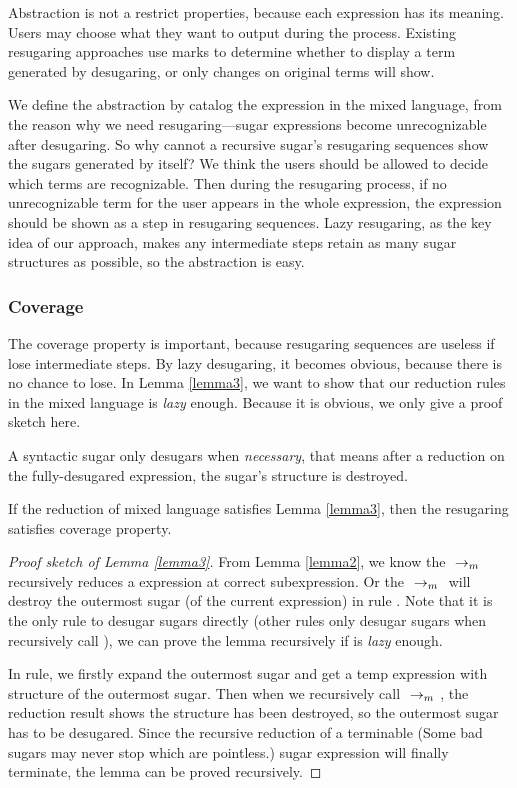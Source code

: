 Abstraction is not a restrict properties, because each expression has its meaning. Users may choose what they want to output during the process. Existing resugaring approaches use marks to determine whether to display a term generated by desugaring, or only changes on original terms will show.

We define the abstraction by catalog the expression in the mixed language, from the reason why we need resugaring---sugar expressions become unrecognizable after desugaring. So why cannot a recursive sugar's resugaring sequences show the sugars generated by itself? We think the users should be allowed to decide which terms are recognizable. Then during the resugaring process, if no unrecognizable term for the user appears in the whole expression, the expression should be shown as a step in resugaring sequences. Lazy resugaring, as the key idea of our approach, makes any intermediate steps retain as many sugar structures as possible, so the abstraction is easy.

\subsubsection{Coverage}
The coverage property is important, because resugaring sequences are useless if lose intermediate steps. By lazy desugaring, it becomes obvious, because there is no chance to lose. In Lemma \ref{lemma3}, we want to show that our reduction rules in the mixed language is \emph{lazy} enough. Because it is obvious, we only give a proof sketch here.
\begin{lemma}
\label{lemma3}
A syntactic sugar only desugars when \emph{necessary}, that means after a reduction on the fully-desugared expression, the sugar's structure is destroyed.
\end{lemma}

\begin{Def}[Coverage]
If the reduction of mixed language satisfies Lemma \ref{lemma3}, then the resugaring satisfies coverage property.
\end{Def}



\begin{proof}[Proof sketch of Lemma \ref{lemma3}]
From Lemma \ref{lemma2}, we know the $~\rightarrow_m~$ recursively reduces a expression at correct subexpression. Or the $~\rightarrow_m~$ will destroy the outermost sugar (of the current expression) in rule . Note that it is the only rule to desugar sugars directly (other rules only desugar sugars when recursively call ), we can prove the lemma recursively if  is \emph{lazy} enough.

In  rule, we firstly expand the outermost sugar and get a temp expression with structure of the outermost sugar. Then when we recursively call $~\rightarrow_m~$, the reduction result shows the structure has been destroyed, so the outermost sugar has to be desugared. Since the recursive reduction of a terminable (Some bad sugars may never stop which are pointless.) sugar expression will finally terminate, the lemma can be proved recursively.
\end{proof}
